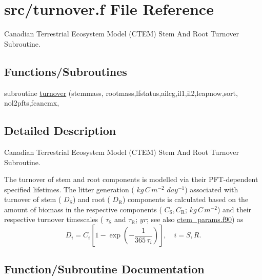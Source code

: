 \hypertarget{turnover_8f}{}\section{src/turnover.f File Reference}
\label{turnover_8f}


Canadian Terrestrial Ecosystem Model (C\+T\+E\+M) Stem And Root Turnover Subroutine.  


\subsection*{Functions/\+Subroutines}
\begin{DoxyCompactItemize}
\item 
subroutine \hyperlink{turnover_8f_adaaa94be49886167722ab507a931c4fe}{turnover} (stemmass, rootmass,lfstatus,ailcg,il1,il2,leapnow,sort, nol2pfts,fcancmx,
\end{DoxyCompactItemize}


\subsection{Detailed Description}
Canadian Terrestrial Ecosystem Model (C\+T\+E\+M) Stem And Root Turnover Subroutine. 

The turnover of stem and root components is modelled via their P\+F\+T-\/dependent specified lifetimes. The litter generation ( $kg\,C\,m^{-2}$ $day^{-1}$) associated with turnover of stem ( $D_\mathrm{S}$) and root ( $D_\mathrm{R}$) components is calculated based on the amount of biomass in the respective components ( $C_\mathrm{S}, C_\mathrm{R}$; $kg\,C\,m^{-2}$) and their respective turnover timescales ( $\tau_\mathrm{S}$ and $\tau_\mathrm{R}$; $yr$; see also \hyperlink{ctem__params_8f90}{ctem\+\_\+params.\+f90}) as \[ \label{citod} D_{i} = C_{i}\left[1 - \exp\left(-\frac{1}{365\,\tau_{i}}\right)\right],\quad i = S, R.\] 

\subsection{Function/\+Subroutine Documentation}
\hypertarget{turnover_8f_adaaa94be49886167722ab507a931c4fe}{}
